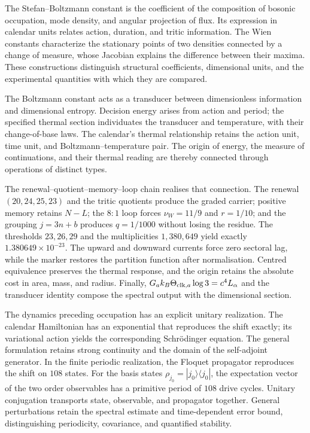 The Stefan--Boltzmann constant is the coefficient of the composition
of bosonic occupation, mode density, and angular projection of flux.
Its expression in calendar units relates action, duration, and tritic
information. The Wien constants characterize the stationary points
of two densities connected by a change of measure, whose Jacobian
explains the difference between their maxima. These constructions
distinguish structural coefficients, dimensional units, and the
experimental quantities with which they are compared.

The Boltzmann constant acts as a transducer between dimensionless
information and dimensional entropy. Decision energy arises from
action and period; the specified thermal section individuates the
transducer and temperature, with their change-of-base laws.
The calendar's thermal relationship retains the action unit,
time unit, and Boltzmann--temperature pair. The origin of energy,
the measure of continuations, and their thermal reading are thereby
connected through operations of distinct types.

The renewal--quotient--memory--loop chain realises that connection. The renewal
$(20,24,25,23)$ and the tritic quotients produce the graded carrier;
positive memory retains $N-L$; the $8{:}1$ loop forces
$\nu_W=11/9$ and $r=1/10$; and the grouping $j=3n+b$ produces
$q=1/1000$ without losing the residue. The thresholds $23,26,29$ and
the multiplicities $1,380,649$ yield exactly
$1.380649\times10^{-23}$. The upward and downward currents force zero
sectoral lag, while the marker restores the partition function after
normalisation. Centred equivalence preserves the thermal response, and
the origin retains the absolute cost in area, mass, and radius. Finally,
$G_a k_B\Theta_{{\rm clk},a}\log3=c^4L_\alpha$ and the transducer
identity compose the spectral output with the dimensional section.

The dynamics preceding occupation has an explicit unitary realization.
The calendar Hamiltonian has an exponential that reproduces the shift
exactly; its variational action yields the corresponding Schrödinger
equation. The general formulation retains strong continuity and
the domain of the self-adjoint generator. In the finite periodic
realization, the Floquet propagator reproduces the shift on \(108\)
states. For the basis states \(\rho_{j_0}=|j_0\rangle\langle j_0|\),
the expectation vector of the two order observables has a primitive
period of \(108\) drive cycles. Unitary conjugation transports state, observable, and propagator
together. General perturbations retain the spectral estimate and
time-dependent error bound, distinguishing periodicity, covariance,
and quantified stability.

